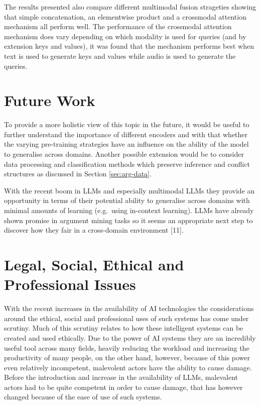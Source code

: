 \documentclass[twocolumn]{article}
\begin{document}
The results presented also compare different multimodal fusion
strageties showing that simple concatenation, an elementwise product and
a crossmodal attention mechanism all perform well. The performance of
the crossmodal attention mechanism does vary depending on which modality
is used for queries (and by extension keys and values), it was found
that the mechanism performs best when text is used to generate keys and
values while audio is used to generate the queries.

\section{Future Work}\label{future-work}

To provide a more holistic view of this topic in the future, it would be
useful to further understand the importance of different encoders and
with that whether the varying pre-training strategies have an influence
on the ability of the model to generalise across domains. Another
possible extension would be to consider data processing and
classification methods which preserve inference and conflict structures
as discussed in Section \ref{sec:arg-data}.

With the recent boom in LLMs and especially multimodal LLMs they provide
an opportunity in terms of their potential ability to generalise across
domains with minimal amounts of learning (e.g.~using in-context
learning). LLMs have already shown promise in argument mining tasks so
it seems an appropriate next step to discover how they fair in a
cross-domain environment {[}11{]}.

\section{Legal, Social, Ethical and Professional
Issues}\label{legal-social-ethical-and-professional-issues}

With the recent increases in the availability of AI technologies the
considerations around the ethical, social and professional uses of such systems has
come under scrutiny. Much of this scrutiny relates to how these
intelligent systems can be created and used ethically. Due to the power
of AI systems they are an incredibly useful tool across many fields,
heavily reducing the workload and increasing the productivity of many
people, on the other hand, however, because of this power even
relatively incompetent, malevolent actors have the ability to cause
damage. Before the introduction and increase in the availability of
LLMs, malevalent actors had to be quite competent in order to cause
damage, that has however changed because of the ease of use of such
systems.
\end{document}
